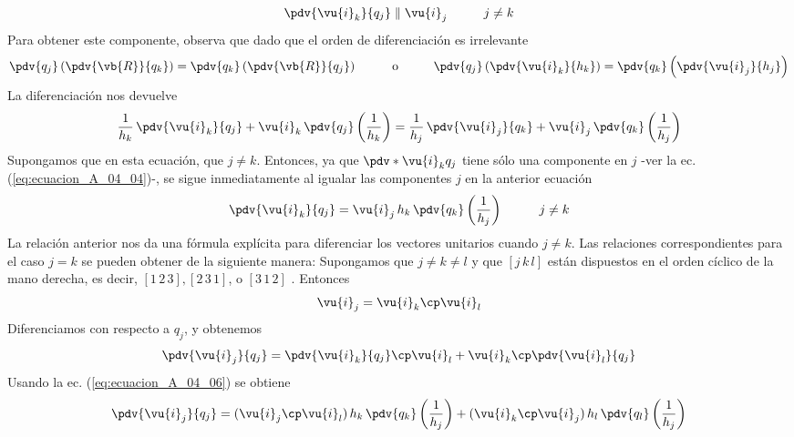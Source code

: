 \begin{align}
\pdv{\vu{i}_{k}}{q_{j}} \parallel \vu{i}_{j} \hspace{1cm} j \neq k 
\label{eq:ecuacion_A_04_04}    
\end{align}
Para obtener este componente, observa que dado que el orden de diferenciación es irrelevante
\begin{align*}
\pdv{q_{j}} \left( \pdv{\vb{R}}{q_{k}} \right) = \pdv{q_{k}} \left( \pdv{\vb{R}}{q_{j}} \right) \hspace{1cm} \mbox{o} \hspace{1cm} \pdv{q_{j}} \left( \pdv{\vu{i}_{k}}{h_{k}} \right) = \pdv{q_{k}} \left( \pdv{\vu{i}_{j}}{h_{j}} \right)
\end{align*}
La diferenciación nos devuelve
\begin{align}
\dfrac{1}{h_{k}} \, \pdv{\vu{i}_{k}}{q_{j}} + \vu{i}_{k} \, \pdv{q_{j}} \left( \dfrac{1}{h_{k}} \right) = \dfrac{1}{h_{j}} \, \pdv{\vu{i}_{j}}{q_{k}} + \vu{i}_{j} \, \pdv{q_{k}} \left( \dfrac{1}{h_{j}} \right)
\label{eq:ecuacion_A_04_05}    
\end{align}
Supongamos que en esta ecuación, que $j \neq k$. Entonces, ya que $\pdv*{\vu{i}_{k}}{q_{j}}$ tiene sólo una componente en $j$ -ver la ec. (\ref{eq:ecuacion_A_04_04})-, se sigue inmediatamente al igualar las componentes $j$ en la anterior ecuación
\begin{align}
\pdv{\vu{i}_{k}}{q_{j}} = \vu{i}_{j} \, h_{k} \, \pdv{q_{k}} \left( \dfrac{1}{h_{j}} \right) \hspace{1cm} j \neq k
\label{eq:ecuacion_A_04_06}    
\end{align}
La relación anterior nos da una fórmula explícita para diferenciar los vectores unitarios cuando $j \neq k$. Las relaciones correspondientes para el caso $j = k$ se pueden obtener de la siguiente manera: Supongamos que $j \neq k \neq l$ y que $[j \, k \, l]$ están dispuestos en el orden cíclico de la mano derecha, es decir, $[1 \, 2 \, 3], [2 \, 3 \,1]$, o $[3 \, 1 \, 2]$ . Entonces
\begin{align*}
\vu{i}_{j} = \vu{i}_{k} \cp \vu{i}_{l}
\end{align*}
Diferenciamos con respecto a $q_{j}$, y obtenemos
\begin{align*}
\pdv{\vu{i}_{j}}{q_{j}} = \pdv{\vu{i}_{k}}{q_{j}} \cp \vu{i}_{l} + \vu{i}_{k} \cp \pdv{\vu{i}_{l}}{q_{j}}
\end{align*}
Usando la ec. (\ref{eq:ecuacion_A_04_06}) se obtiene
\begin{align*}
\pdv{\vu{i}_{j}}{q_{j}} = (\vu{i}_{j} \cp \vu{i}_{l}) \, h_{k} \, \pdv{q_{k}} \left( \dfrac{1}{h_{j}} \right) + (\vu{i}_{k} \cp \vu{i}_{j}) \, h_{l} \, \pdv{q_{l}} \left( \dfrac{1}{h_{j}} \right)
\end{align*}
